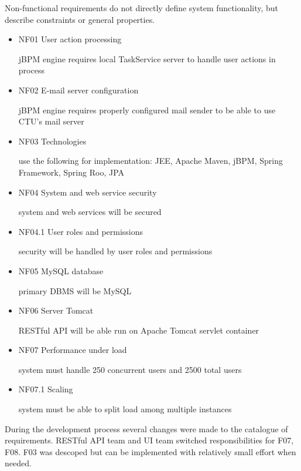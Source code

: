 	Non-functional requirements do not directly define system functionality, but describe constraints or general
	properties.
	
	\begin{itemize}
		\item NF01 User action processing
	
		jBPM engine requires local TaskService server to handle user actions in process
		
		\item NF02 E-mail server configuration

		jBPM engine requires properly configured mail sender to be able to use CTU's mail server
		
		\item NF03 Technologies
		\label{itm:NF03}
		
		use the following for implementation: JEE, Apache Maven, jBPM, Spring Framework, Spring Roo, JPA
		
		\item NF04 System and web service security
		
		system and web services will be secured
		
		\item NF04.1 User roles and permissions
		
		security will be handled by user roles and permissions
		
		\item NF05 MySQL database
		
		primary DBMS will be MySQL
		
		\item NF06 Server Tomcat
		
		RESTful API will be able run on Apache Tomcat servlet container
		
		\item NF07 Performance under load
		\label{itm:NF07}
		
		system must handle 250 concurrent users and 2500 total users
		
		\item NF07.1 Scaling
		
		system must be able to split load among multiple instances
	\end{itemize}
	
	During the development process several changes were made to the catalogue of requirements. RESTful API team and UI team
	switched responsibilities for  F07, F08. F03 was descoped but can be implemented with relatively small effort when
	needed.
	
